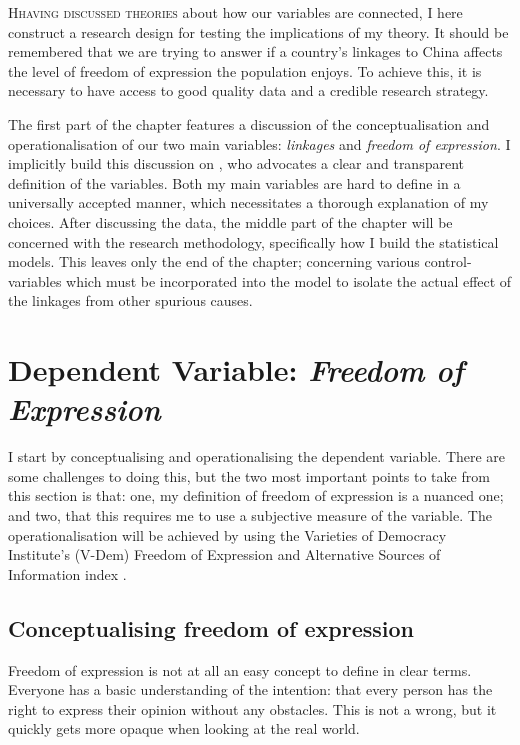 \lettrine{H}{having discussed theories} about how our variables are connected, I here construct a research design for testing the implications of my theory. It should be remembered that we are trying to answer if a country's linkages to China affects the level of freedom of expression the population enjoys. To achieve this, it is necessary to have access to good quality data and a credible research strategy.

The first part of the chapter features a discussion of the conceptualisation and operationalisation of our two main variables: \textit{linkages} and \textit{freedom of expression}. I implicitly build this discussion on \citet{adcock_measurement_2001, gerring_what_1999}, who advocates a clear and transparent definition of the variables. Both my main variables are hard to define in a universally accepted manner, which necessitates a thorough explanation of my choices. After discussing the data, the middle part of the chapter will be concerned with the research methodology, specifically how I build the statistical models. This leaves only the end of the chapter; concerning various control-variables which must be incorporated into the model to isolate the actual effect of the linkages from other spurious causes. 

\section{Dependent Variable: \textit{Freedom of Expression}}
I start by conceptualising and operationalising the dependent variable. There are some challenges to doing this, but the two most important points to take from this section is that: one, my definition of freedom of expression is a nuanced one; and two, that this requires me to use a subjective measure of the variable. The operationalisation will be achieved by using the Varieties of Democracy Institute's (V-Dem) Freedom of Expression and Alternative Sources of Information index \citep{coppedge_v-dem_2025}. 

\subsection{Conceptualising freedom of expression}
Freedom of expression is not at all an easy concept to define in clear terms. Everyone has a basic understanding of the intention: that every person has the right to express their opinion without any obstacles. This is not a wrong, but it quickly gets more opaque when looking at the real world.

